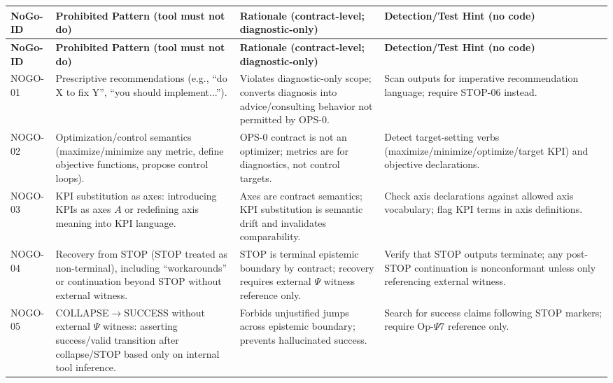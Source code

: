 \begingroup
\small
\setlength{\LTleft}{0pt}
\setlength{\LTright}{0pt}
\begin{longtable}{|p{1.8cm}|p{6.8cm}|p{5.2cm}|p{4.5cm}|}
\hline
\textbf{NoGo-ID} & \textbf{Prohibited Pattern (tool must not do)} & \textbf{Rationale (contract-level; diagnostic-only)} & \textbf{Detection/Test Hint (no code)} \\
\hline
\endfirsthead

\hline
\textbf{NoGo-ID} & \textbf{Prohibited Pattern (tool must not do)} & \textbf{Rationale (contract-level; diagnostic-only)} & \textbf{Detection/Test Hint (no code)} \\
\hline
\endhead

\hline
\endfoot

\hline
\endlastfoot

NOGO-01 &
Prescriptive recommendations (e.g., ``do X to fix Y'', ``you should implement...''). &
Violates diagnostic-only scope; converts diagnosis into advice/consulting behavior not permitted by OPS-0. &
Scan outputs for imperative recommendation language; require STOP-06 instead. \\
\hline

NOGO-02 &
Optimization/control semantics (maximize/minimize any metric, define objective functions, propose control loops). &
OPS-0 contract is not an optimizer; metrics are for diagnostics, not control targets. &
Detect target-setting verbs (maximize/minimize/optimize/target KPI) and objective declarations. \\
\hline

NOGO-03 &
KPI substitution as axes: introducing KPIs as axes $A$ or redefining axis meaning into KPI language. &
Axes are contract semantics; KPI substitution is semantic drift and invalidates comparability. &
Check axis declarations against allowed axis vocabulary; flag KPI terms in axis definitions. \\
\hline

NOGO-04 &
Recovery from STOP (STOP treated as non-terminal), including ``workarounds'' or continuation beyond STOP without external witness. &
STOP is terminal epistemic boundary by contract; recovery requires external $\Psi$ witness reference only. &
Verify that STOP outputs terminate; any post-STOP continuation is nonconformant unless only referencing external witness. \\
\hline

NOGO-05 &
COLLAPSE$\rightarrow$SUCCESS without external $\Psi$ witness: asserting success/valid transition after collapse/STOP based only on internal tool inference. &
Forbids unjustified jumps across epistemic boundary; prevents hallucinated success. &
Search for success claims following STOP markers; require Op-$\Psi7$ reference only. \\
\hline


\end{longtable}
